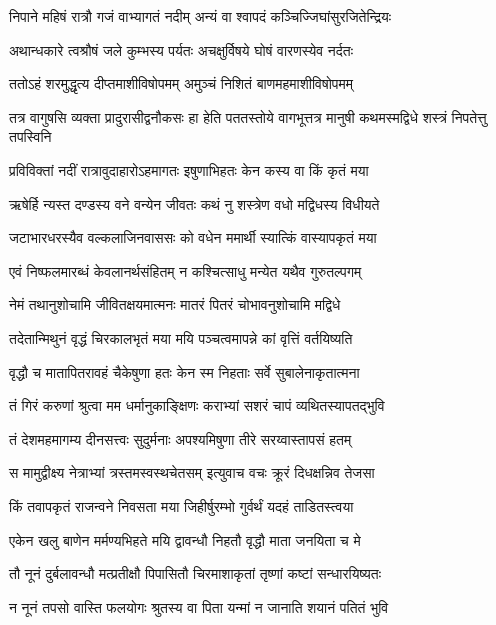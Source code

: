 \twolineshloka
{निपाने महिषं रात्रौ गजं वाभ्यागतं नदीम्}
{अन्यं वा श्वापदं कञ्चिज्जिघांसुरजितेन्द्रियः} %

\twolineshloka
{अथान्धकारे त्वश्रौषं जले कुम्भस्य पर्यतः}
{अचक्षुर्विषये घोषं वारणस्येव नर्दतः} %

\twolineshloka
{ततोऽहं शरमुद्धृत्य दीप्तमाशीविषोपमम्}
{अमुञ्चं निशितं बाणमहमाशीविषोपमम्} %

\threelineshloka
{तत्र वागुषसि व्यक्ता प्रादुरासीद्वनौकसः}
{हा हेति पततस्तोये वागभूत्तत्र मानुषी}
{कथमस्मद्विधे शस्त्रं निपतेत्तु तपस्विनि} %

\twolineshloka
{प्रविविक्तां नदीं रात्रावुदाहारोऽहमागतः}
{इषुणाभिहतः केन कस्य वा किं कृतं मया} %

\twolineshloka
{ऋषेर्हि न्यस्त दण्डस्य वने वन्येन जीवतः}
{कथं नु शस्त्रेण वधो मद्विधस्य विधीयते} %

\twolineshloka
{जटाभारधरस्यैव वल्कलाजिनवाससः}
{को वधेन ममार्थी स्यात्किं वास्यापकृतं मया} %

\twolineshloka
{एवं निष्फलमारब्धं केवलानर्थसंहितम्}
{न कश्चित्साधु मन्येत यथैव गुरुतल्पगम्} %

\twolineshloka
{नेमं तथानुशोचामि जीवितक्षयमात्मनः}
{मातरं पितरं चोभावनुशोचामि मद्विधे} %

\twolineshloka
{तदेतान्मिथुनं वृद्धं चिरकालभृतं मया}
{मयि पञ्चत्वमापन्ने कां वृत्तिं वर्तयिष्यति} %

\twolineshloka
{वृद्धौ च मातापितरावहं चैकेषुणा हतः}
{केन स्म निहताः सर्वे सुबालेनाकृतात्मना} %

\twolineshloka
{तं गिरं करुणां श्रुत्वा मम धर्मानुकाङ्क्षिणः}
{कराभ्यां सशरं चापं व्यथितस्यापतद्भुवि} %

\twolineshloka
{तं देशमहमागम्य दीनसत्त्वः सुदुर्मनाः}
{अपश्यमिषुणा तीरे सरय्वास्तापसं हतम्} %

\twolineshloka
{स मामुद्वीक्ष्य नेत्राभ्यां त्रस्तमस्वस्थचेतसम्}
{इत्युवाच वचः क्रूरं दिधक्षन्निव तेजसा} %

\twolineshloka
{किं तवापकृतं राजन्वने निवसता मया}
{जिहीर्षुरम्भो गुर्वर्थं यदहं ताडितस्त्वया} %

\twolineshloka
{एकेन खलु बाणेन मर्मण्यभिहते मयि}
{द्वावन्धौ निहतौ वृद्धौ माता जनयिता च मे} %

\twolineshloka
{तौ नूनं दुर्बलावन्धौ मत्प्रतीक्षौ पिपासितौ}
{चिरमाशाकृतां तृष्णां कष्टां सन्धारयिष्यतः} %

\twolineshloka
{न नूनं तपसो वास्ति फलयोगः श्रुतस्य वा}
{पिता यन्मां न जानाति शयानं पतितं भुवि} %

